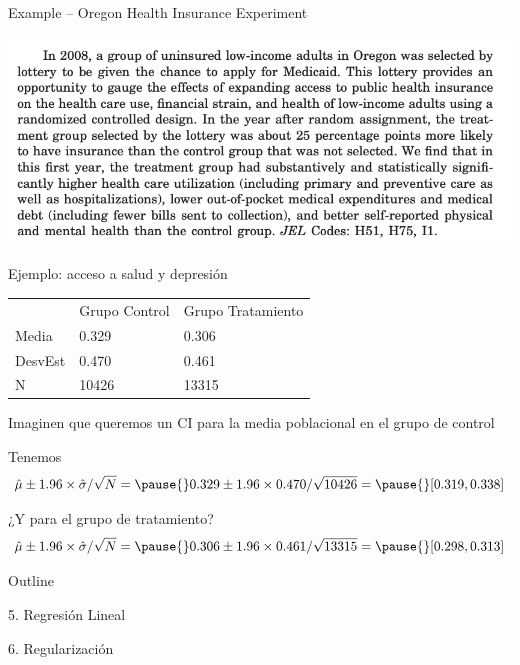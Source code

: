 \documentclass[11pt,handout,aspectratio=169]{beamer}
\newenvironment{wideitemize}{\itemize\addtolength{\itemsep}{10pt}}{\enditemize}
\begin{document}
\begin{frame}{Example -- Oregon Health Insurance Experiment}
	
\begin{center}
\includegraphics[width = 0.9 \linewidth]{ohie-abstract}	
\end{center}
\end{frame}


\begin{frame}{Ejemplo: acceso a salud y depresión}

\begin{tabular}{lll}
 & Grupo Control & Grupo Tratamiento \\
 Media & 0.329 & 0.306\\
 DesvEst & 0.470 &  0.461 \\
 N & 10426 & 13315  
\end{tabular}

\pause
\begin{wideitemize}
	\item
	Imaginen que queremos un CI para la media poblacional en el grupo de control
	\pause
	\item
	Tenemos $$\hat\mu \pm 1.96 \times \hat\sigma / \sqrt{N} = \pause{} 0.329 \pm 1.96 \times 0.470 / \sqrt{10426} =  \pause{} [0.319, 0.338] $$
	
	\pause
	\item
	¿Y para el grupo de tratamiento?
	\pause
	$$\hat\mu \pm 1.96 \times  \hat\sigma / \sqrt{N} = \pause{} 0.306 \pm 1.96 \times 0.461 / \sqrt{13315} =  \pause{} [0.298, 0.313] $$
\end{wideitemize}

\end{frame}





\begin{frame}{Outline}
	
	
	
	5. Regresión Lineal
	
	\vspace{0.8cm}
	6. Regularización 	
	
\end{frame}
\end{document}
